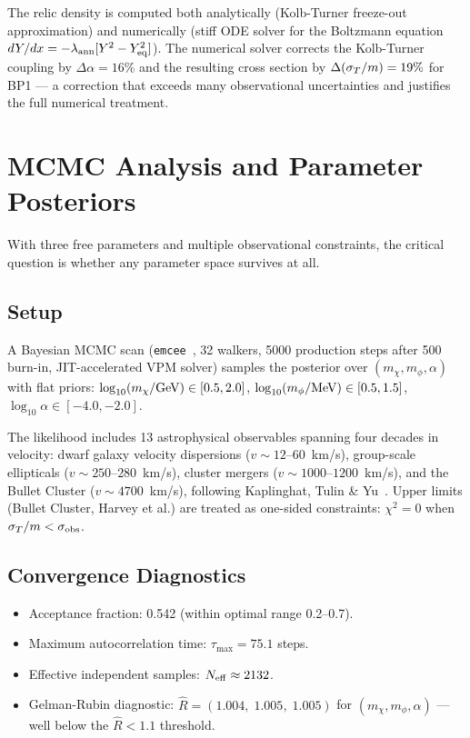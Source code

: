 The relic density is computed both analytically (Kolb-Turner freeze-out
approximation) and numerically (stiff ODE solver for the Boltzmann equation
$dY/dx = -\lambda_{\rm ann}[Y^2 - Y_{\rm eq}^2]$). The numerical solver
corrects the Kolb-Turner coupling by $\Delta\alpha = 16\%$ and the resulting
cross section by $\Delta(\sigma_T/m) = 19\%$ for BP1 — a correction that
exceeds many observational uncertainties and justifies the full numerical treatment.


\section{MCMC Analysis and Parameter Posteriors}
\label{ch1:mcmc}

With three free parameters and multiple observational constraints, the
critical question is whether any parameter space survives at all.

\subsection{Setup}

A Bayesian MCMC scan (\texttt{emcee}~\cite{emcee}, 32 walkers, 5000 production
steps after 500 burn-in, JIT-accelerated VPM solver) samples the posterior
over $(m_\chi, m_\phi, \alpha)$ with flat priors:
$\log_{10}(m_\chi/{\rm GeV}) \in [0.5, 2.0]$,
$\log_{10}(m_\phi/{\rm MeV}) \in [0.5, 1.5]$,
$\log_{10}\alpha \in [-4.0, -2.0]$.

The likelihood includes 13 astrophysical observables spanning four decades in velocity:
dwarf galaxy velocity dispersions ($v \sim 12$--$60$~km/s),
group-scale ellipticals ($v \sim 250$--$280$~km/s),
cluster mergers ($v \sim 1000$--$1200$~km/s),
and the Bullet Cluster ($v \sim 4700$~km/s), following
Kaplinghat, Tulin \& Yu~\cite{Kaplinghat2016}.
Upper limits (Bullet Cluster, Harvey et al.) are treated as one-sided
constraints: $\chi^2 = 0$ when $\sigma_T/m < \sigma_{\rm obs}$.

\subsection{Convergence Diagnostics}

\begin{itemize}
\item Acceptance fraction: 0.542 (within optimal range 0.2--0.7).
\item Maximum autocorrelation time: $\tau_{\max} = 75.1$ steps.
\item Effective independent samples: $N_{\rm eff} \approx 2132$.
\item Gelman-Rubin diagnostic: $\hat{R} = (1.004,\; 1.005,\; 1.005)$
      for $(m_\chi, m_\phi, \alpha)$ — well below the $\hat{R} < 1.1$ threshold.
\end{itemize}

